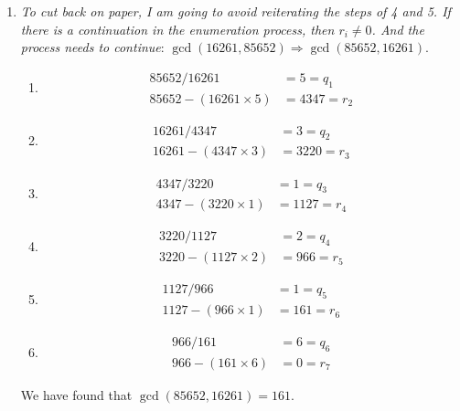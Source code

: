 {\begin{enumerate}
\begin{enumerate}[label=(\arabic*)]
        \begin{align*}
            18 / 3 &= 6 = q_4 \\
            18 - (3 \times 6) &= 0 = r_5
        \end{align*}
        \item \(r_4 = 0\). So, we stop.
    \end{enumerate}
    We have found that the greatest common divisor is \(3\).
    \item \textit{To cut back on paper, I am going to avoid reiterating the steps of 4 and 5. If there is a continuation in the enumeration process, then \(r_i \ne 0\). And the process needs to continue}: \(\gcd(16261,85652) \Rightarrow \gcd(85652,16261)\).
    \begin{enumerate}[label=(\arabic*)]
    \item
    \begin{align*}
        85652 / 16261 &= 5 = q_1 \\
        85652 - (16261 \times 5) &= 4347 = r_2
    \end{align*}
    \item 
    \begin{align*}
        16261 / 4347 &= 3 = q_2 \\
        16261 - (4347 \times 3) &= 3220 = r_3
    \end{align*}
    \item 
    \begin{align*}
        4347 / 3220 &= 1 = q_3 \\
        4347 - (3220 \times 1) &= 1127 = r_4
    \end{align*}
    \item 
    \begin{align*}
        3220 / 1127 &= 2 = q_4 \\
        3220 - (1127 \times 2) &= 966 = r_5
    \end{align*}
    \item 
    \begin{align*}
        1127 / 966 &= 1 = q_5 \\
        1127 - (966 \times 1) &= 161 = r_6
    \end{align*}
    \item 
    \begin{align*}
        966 / 161 &= 6 = q_6 \\
        966 - (161 \times 6) &= 0 = r_7 
    \end{align*}
    \end{enumerate}
    We have found that \(\gcd(85652,16261) = 161\).
    
\end{enumerate}
}

